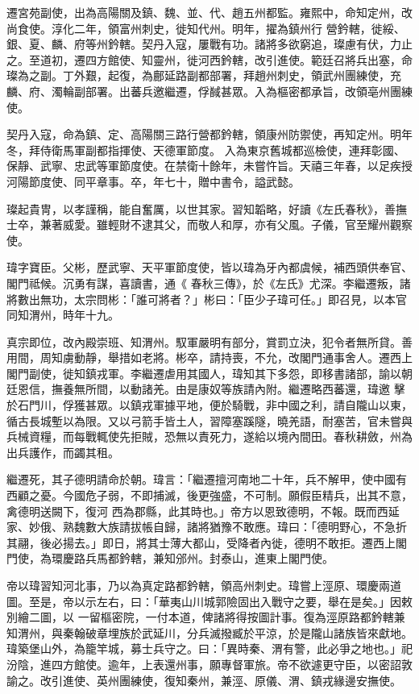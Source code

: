 \begin{pinyinscope}
 遷宮苑副使，出為高陽關及鎮、魏、並、代、趙五州都監。雍熙中，命知定州，改尚食使。淳化二年，領富州刺史，徙知代州。明年，擢為鎮州行
 營鈐轄，徙綏、銀、夏、麟、府等州鈐轄。契丹入寇，屢戰有功。諸將多欲窮追，璨慮有伏，力止之。至道初，遷四方館使、知靈州，徙河西鈐轄，改引進使。範廷召將兵出塞，命璨為之副。丁外艱，起復，為鄜延路副都部署，拜趙州刺史，領武州團練使，充麟、府、濁輪副部署。出蕃兵邀繼遷，俘馘甚眾。入為樞密都承旨，改領亳州團練使。



 契丹入寇，命為鎮、定、高陽關三路行營都鈐轄，領康州防禦使，再知定州。明年冬，拜侍衛馬軍副都指揮使、天德軍節度。
 入為東京舊城都巡檢使，連拜彰國、保靜、武寧、忠武等軍節度使。在禁衛十餘年，未嘗忤旨。天禧三年春，以足疾授河陽節度使、同平章事。卒，年七十，贈中書令，謚武懿。



 璨起貴冑，以孝謹稱，能自奮厲，以世其家。習知韜略，好讀《左氏春秋》，善撫士卒，兼著威愛。雖輕財不逮其父，而敬人和厚，亦有父風。子儀，官至耀州觀察使。



 瑋字寶臣。父彬，歷武寧、天平軍節度使，皆以瑋為牙內都虞候，補西頭供奉官、閣門祗候。沉勇有謀，喜讀書，通《
 春秋三傳》，於《左氏》尤深。李繼遷叛，諸將數出無功，太宗問彬：「誰可將者？」彬曰：「臣少子瑋可任。」即召見，以本官同知渭州，時年十九。



 真宗即位，改內殿崇班、知渭州。馭軍嚴明有部分，賞罰立決，犯令者無所貸。善用間，周知虜動靜，舉措如老將。彬卒，請持喪，不允，改閣門通事舍人。遷西上閣門副使，徙知鎮戎軍。李繼遷虐用其國人，瑋知其下多怨，即移書諸部，諭以朝廷恩信，撫養無所間，以動諸羌。由是康奴等族請內附。繼遷略西蕃還，瑋邀
 擊於石門川，俘獲甚眾。以鎮戎軍據平地，便於騎戰，非中國之利，請自隴山以東，循古長城塹以為限。又以弓箭手皆土人，習障塞蹊隧，曉羌語，耐塞苦，官未嘗與兵械資糧，而每戰輒使先拒賊，恐無以責死力，遂給以境內間田。春秋耕斂，州為出兵護作，而蠲其租。



 繼遷死，其子德明請命於朝。瑋言：「繼遷擅河南地二十年，兵不解甲，使中國有西顧之憂。今國危子弱，不即捕滅，後更強盛，不可制。願假臣精兵，出其不意，禽德明送闕下，復河
 西為郡縣，此其時也。」帝方以恩致德明，不報。既而西延家、妙俄、熟魏數大族請拔帳自歸，諸將猶豫不敢應。瑋曰：「德明野心，不急折其翮，後必揚去。」即日，將其士薄大都山，受降者內徙，德明不敢拒。遷西上閣門使，為環慶路兵馬都鈐轄，兼知邠州。封泰山，進東上閣門使。



 帝以瑋習知河北事，乃以為真定路都鈐轄，領高州刺史。瑋嘗上涇原、環慶兩道圖。至是，帝以示左右，曰：「華夷山川城郭險固出入戰守之要，舉在是矣。」因敕別繪二圖，以
 一留樞密院，一付本道，俾諸將得按圖計事。復為涇原路都鈐轄兼知渭州，與秦翰破章埋族於武延川，分兵滅撥臧於平涼，於是隴山諸族皆來獻地。瑋築堡山外，為籠竿城，募士兵守之。曰：「異時秦、渭有警，此必爭之地也。」祀汾陰，進四方館使。逾年，上表還州事，願專督軍旅。帝不欲遽更守臣，以密詔敦諭之。改引進使、英州團練使，復知秦州，兼涇、原儀、渭、鎮戎緣邊安撫使。




\end{pinyinscope}
